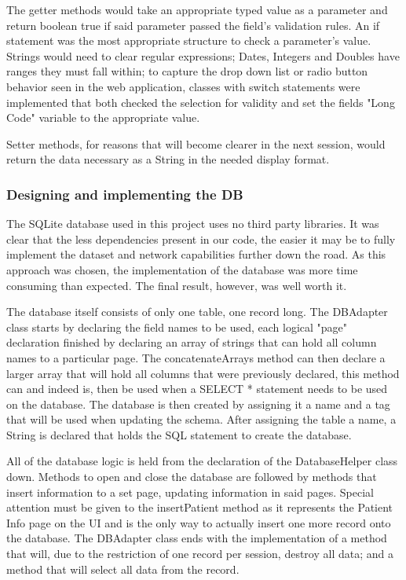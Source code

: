 \documentclass[12pt,a4paper,oneside,titlepage]{article}
\begin{document}
The getter methods would take an appropriate typed value as a parameter and return boolean true if said parameter passed the field's validation rules. An if statement was the most appropriate structure to check a parameter's value. Strings would need to clear regular expressions; Dates, Integers and Doubles have ranges they must fall within; to capture the drop down list or radio button behavior seen in the web application, classes with switch statements were implemented that both checked the selection for validity and set the fields "Long Code" variable to the appropriate value.

Setter methods, for reasons that will become clearer in the next session, would return the data necessary as a String in the needed display format.

\subsubsection{Designing and implementing the DB}
The SQLite database used in this project uses no third party libraries. It was clear that the less dependencies present in our code, the easier it may be to fully implement the dataset and network capabilities further down the road. As this approach was chosen, the implementation of the database was more time consuming than expected. The final result, however, was well worth it.

The database itself consists of only one table, one record long. The DBAdapter class starts by declaring the field names to be used, each logical "page" declaration finished by declaring an array of strings that can hold all column names to a particular page. The concatenateArrays method can then declare a larger array that will hold all columns that were previously declared, this method can and indeed is, then be used when a SELECT * statement needs to be used on the database. The database is then created by assigning it a name and a tag that will be used when updating the schema. After assigning the table a name, a String is declared that holds the SQL statement to create the database.

All of the database logic is held from the declaration of the DatabaseHelper class down. Methods to open and close the database are followed by methods that insert information to a set page, updating information in said pages. Special attention must be given to the insertPatient method as it represents the Patient Info page on the UI and is the only way to actually insert one more record onto the database. The DBAdapter class ends with the implementation of a method that will, due to the restriction of one record per session, destroy all data; and a method that will select all data from the record.
\end{document}
